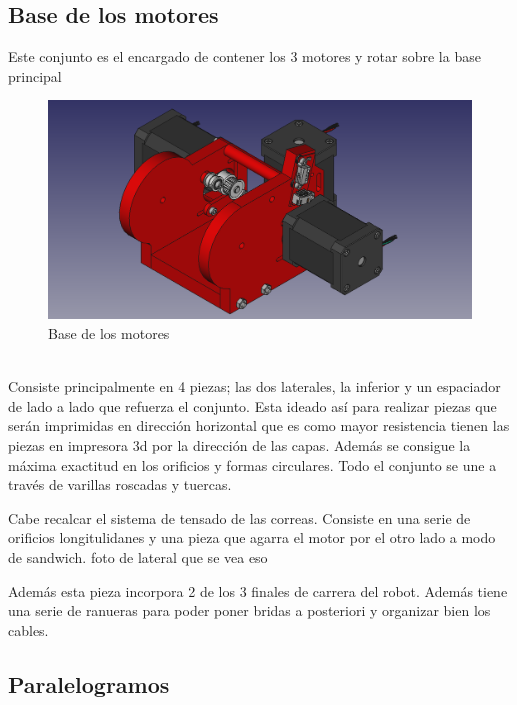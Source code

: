 \subsection{Base de los motores}
\noindent Este conjunto es el encargado de contener los 3 motores y rotar sobre la base principal
\begin{figure} [ht!]
  \begin{center}
    \includegraphics[width=12cm]{figs/base_motores.png}
  \end{center}
  \caption{Base de los motores}
\end{figure}\ 
\\
Consiste principalmente en 4 piezas; las dos laterales, la inferior y un espaciador de lado a lado que refuerza el conjunto. Esta ideado así 
para realizar piezas que serán imprimidas en dirección horizontal que es como mayor resistencia tienen las piezas en impresora 3d por la 
dirección de las capas. Además se consigue la máxima exactitud en los orificios y formas circulares. Todo el conjunto se une a través de 
varillas roscadas y tuercas.

Cabe recalcar el sistema de tensado de las correas. Consiste en una serie de orificios longitulidanes y una pieza que agarra el motor por 
el otro lado a modo de sandwich.
foto de lateral que se vea eso

Además esta pieza incorpora 2 de los 3 finales de carrera del robot. Además tiene una serie de ranueras para poder poner bridas a posteriori y 
organizar bien los cables.
\subsection{Paralelogramos}
\newpage
